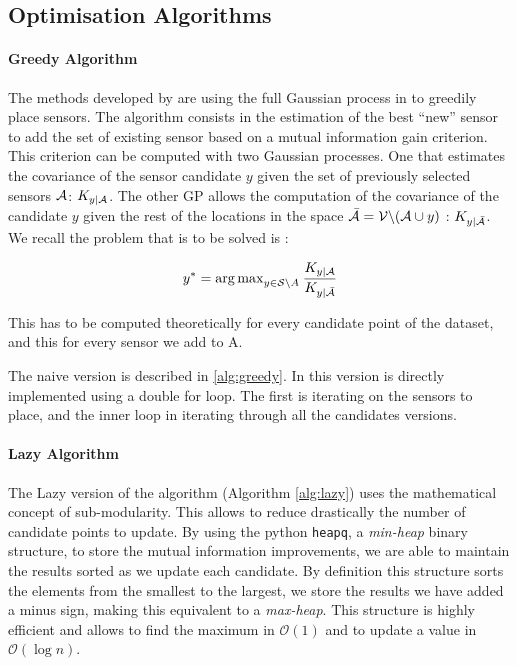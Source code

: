 \subsection{Optimisation Algorithms}

\paragraph{Greedy Algorithm}

The methods developed by \citet{krause_near-optimal_2008} are using the full Gaussian process in to greedily place sensors. The algorithm consists in the estimation of the best “new” sensor to add the set of existing sensor based on a mutual information gain criterion. This criterion can be computed with two Gaussian processes. One that estimates the covariance of the sensor candidate $y$ given the set of previously selected sensors $\mathcal{A}$: $K_{y | \mathcal{A}}$. The other GP allows the computation of the covariance of the candidate $y$ given the rest of the locations in the space $\bar{\mathcal{A}} = \mathcal{V} \backslash ( \mathcal{A} \cup y )$ : $K_{y | \bar{\mathcal{A}}}$. We recall the problem that is to be solved is :

\begin{equation}
    y^* = {\arg \max}_{y \in \mathcal{S} \backslash A } \: \frac{K_{y | \mathcal{A}}}{K_{y | \bar{\mathcal{A}}}}
\end{equation}

This has to be computed theoretically for every candidate point of the dataset, and this for every sensor we add to A. 

The naive version is described in \ref{alg:greedy}. In this version is directly implemented using a double for loop. The first is iterating on the sensors to place, and the inner loop in iterating through all the candidates versions. 

\paragraph{Lazy Algorithm}

The Lazy version of the algorithm (Algorithm \ref{alg:lazy}) uses the mathematical concept of sub-modularity. This allows to reduce drastically the number of candidate points to update. By using the python \texttt{heapq}, a \textit{min-heap} binary structure, to store the mutual information improvements, we are able to maintain the results sorted as we update each candidate. By definition this structure sorts the elements from the smallest to the largest, we store the results we have added a minus sign, making this equivalent to a \textit{max-heap}. This structure is highly efficient and allows to find the maximum in $\mathcal{O}(1)$ and to update a value in $\mathcal{O}(\log n)$. 


